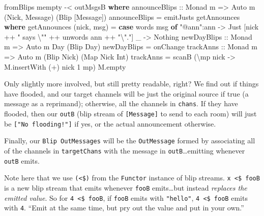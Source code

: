 \documentclass[]{article}
\newenvironment{Shaded}{}{}
\newcommand{\KeywordTok}[1]{\textcolor[rgb]{0.00,0.44,0.13}{\textbf{{#1}}}}
\newcommand{\DataTypeTok}[1]{\textcolor[rgb]{0.56,0.13,0.00}{{#1}}}
\newcommand{\DecValTok}[1]{\textcolor[rgb]{0.25,0.63,0.44}{{#1}}}
\newcommand{\StringTok}[1]{\textcolor[rgb]{0.25,0.44,0.63}{{#1}}}
\newcommand{\OtherTok}[1]{\textcolor[rgb]{0.00,0.44,0.13}{{#1}}}
\newcommand{\FunctionTok}[1]{\textcolor[rgb]{0.02,0.16,0.49}{{#1}}}
\newcommand{\NormalTok}[1]{{#1}}
\begin{document}
\begin{Shaded}
\begin{Highlighting}[]
    \NormalTok{fromBlips mempty }\FunctionTok{-<} \NormalTok{outMsgsB}
  \KeywordTok{where}
\OtherTok{    announceBlips ::} \DataTypeTok{Monad} \NormalTok{m }\OtherTok{=>} \DataTypeTok{Auto} \NormalTok{m (}\DataTypeTok{Nick}\NormalTok{, }\DataTypeTok{Message}\NormalTok{) (}\DataTypeTok{Blip} \NormalTok{[}\DataTypeTok{Message}\NormalTok{])}
    \NormalTok{announceBlips }\FunctionTok{=} \NormalTok{emitJusts getAnnounces}
      \KeywordTok{where}
        \NormalTok{getAnnounces (nick, msg) }\FunctionTok{=}
          \KeywordTok{case} \NormalTok{words msg }\KeywordTok{of}
            \StringTok{"@ann"}\FunctionTok{:}\NormalTok{ann }\OtherTok{->} \DataTypeTok{Just} \NormalTok{[nick }\FunctionTok{++} \StringTok{" says \textbackslash{}""} \FunctionTok{++} \NormalTok{unwords ann }\FunctionTok{++} \StringTok{"\textbackslash{}"."}\NormalTok{]}
            \NormalTok{_          }\OtherTok{->} \DataTypeTok{Nothing}
\OtherTok{    newDayBlips ::} \DataTypeTok{Monad} \NormalTok{m }\OtherTok{=>} \DataTypeTok{Auto} \NormalTok{m }\DataTypeTok{Day} \NormalTok{(}\DataTypeTok{Blip} \DataTypeTok{Day}\NormalTok{)}
    \NormalTok{newDayBlips }\FunctionTok{=} \NormalTok{onChange}
\OtherTok{    trackAnns ::} \DataTypeTok{Monad} \NormalTok{m }\OtherTok{=>} \DataTypeTok{Auto} \NormalTok{m (}\DataTypeTok{Blip} \DataTypeTok{Nick}\NormalTok{) (}\DataTypeTok{Map} \DataTypeTok{Nick} \DataTypeTok{Int}\NormalTok{)}
    \NormalTok{trackAnns }\FunctionTok{=} \NormalTok{scanB (\textbackslash{}mp nick }\OtherTok{->} \NormalTok{M.insertWith (}\FunctionTok{+}\NormalTok{) nick }\DecValTok{1} \NormalTok{mp) M.empty}
\end{Highlighting}
\end{Shaded}

Only slightly more involved, but still pretty readable, right? We find
out if things have flooded, and our target channels will be just the
original source if true (a message as a reprimand); otherwise, all the
channels in \texttt{chans}. If they have flooded, then our \texttt{outB}
(blip stream of \texttt{{[}Message{]}} to send to each room) will just
be \texttt{{[}"No\ flooding!"{]}} if yes, or the actual announcement
otherwise.

Finally, our \texttt{Blip\ OutMessages} will be the \texttt{OutMessage}
formed by associating all of the channels in \texttt{targetChans} with
the message in \texttt{outB}\ldots{}emitting whenever \texttt{outB}
emits.

Note here that we use \texttt{(\textless{}\$)} from the \texttt{Functor}
instance of blip streams. \texttt{x\ \textless{}\$\ fooB} is a new blip
stream that emits whenever \texttt{fooB} emits\ldots{}but instead
\emph{replaces the emitted value}. So for
\texttt{4\ \textless{}\$\ fooB}, if \texttt{fooB} emits with
\texttt{"hello"}, \texttt{4\ \textless{}\$\ fooB} emits with \texttt{4}.
``Emit at the same time, but pry out the value and put in your own.''
\end{document}
